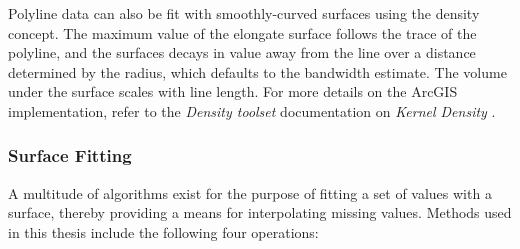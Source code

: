 Polyline data can also be fit with smoothly-curved surfaces using the density concept. The maximum value of the elongate surface follows the trace of the polyline, and the surfaces decays in value away from the line over a distance determined by the radius, which defaults to the bandwidth estimate. The volume under the surface scales with line length. For more details on the ArcGIS implementation, refer to the \textit{Density toolset} documentation on \textit{Kernel Density} \citep{esri_kernel_2021}.

\subsubsection{Surface Fitting}\label{ch3:surface_fit}
A multitude of algorithms exist for the purpose of fitting a set of values with a surface, thereby providing a means for interpolating missing values. Methods used in this thesis include the following four operations:

